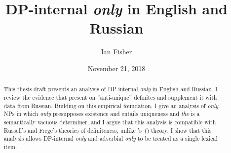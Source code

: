 \documentclass{article}
\title{DP-internal \textit{only} in English and Russian}
\author{Ian Fisher}
\date{November 21, 2018}
\newcommand{\citegen}[1]{\citeauthor{#1}'s~(\citeyear{#1})}
\begin{document}
\maketitle

\begin{abstract}
This thesis draft presents an analysis of DP-internal \textit{only} in English and Russian. I review the evidence that \citet{cb2012b, cb2015} present on ``anti-unique'' definites and supplement it with data from Russian. Building on this empirical foundation, I give an analysis of \textit{only} NPs in which \textit{only} presupposes existence and entails uniqueness and \textit{the} is a semantically vacuous determiner, and I argue that this analysis is compatible with Russell's and Frege's theories of definiteness, unlike \citegen{cb2015} theory. I show that this analysis allows DP-internal \textit{only} and adverbial \textit{only} to be treated as a single lexical item.
\end{abstract}












\end{document}
